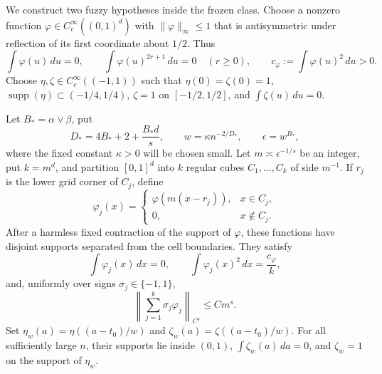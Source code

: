 We construct two fuzzy hypotheses inside the frozen class. Choose a nonzero function \(\varphi\in C_c^\infty((0,1)^d)\) with \(\lVert\varphi\rVert_\infty\le1\) that is antisymmetric under reflection of its first coordinate about \(1/2\). Thus
\[
\int\varphi(u)\,du=0,
\qquad
\int\varphi(u)^{2r+1}\,du=0\quad(r\ge0),
\qquad
c_\varphi:=\int\varphi(u)^2\,du>0.
\]
Choose \(\eta,\zeta\in C_c^\infty((-1,1))\) such that \(\eta(0)=\zeta(0)=1\), \(\operatorname{supp}(\eta)\subset(-1/4,1/4)\), \(\zeta=1\) on \([-1/2,1/2]\), and \(\int\zeta(u)\,du=0\).

Let \(B_*=\alpha\vee\beta\), put
\[
D_*=4B_*+2+\frac{B_*d}{s},
\qquad
w=\kappa n^{-2/D_*},
\qquad
\epsilon=w^{B_*},
\]
where the fixed constant \(\kappa>0\) will be chosen small. Let \(m\asymp\epsilon^{-1/s}\) be an integer, put \(k=m^d\), and partition \([0,1]^d\) into \(k\) regular cubes \(C_1,\ldots,C_k\) of side \(m^{-1}\). If \(r_j\) is the lower grid corner of \(C_j\), define
\[
\varphi_j(x)=
\begin{cases}
\varphi(m(x-r_j)),&x\in C_j,\\
0,&x\notin C_j.
\end{cases}
\]
After a harmless fixed contraction of the support of \(\varphi\), these functions have disjoint supports separated from the cell boundaries. They satisfy
\[
\int\varphi_j(x)\,dx=0,
\qquad
\int\varphi_j(x)^2\,dx=\frac{c_\varphi}{k},
\]
and, uniformly over signs \(\sigma_j\in\{-1,1\}\),
\[
\left\lVert\sum_{j=1}^k\sigma_j\varphi_j\right\rVert_{C^s}
\le C m^s.
\]
Set \(\eta_w(a)=\eta((a-t_0)/w)\) and \(\zeta_w(a)=\zeta((a-t_0)/w)\). For all sufficiently large \(n\), their supports lie inside \((0,1)\), \(\int\zeta_w(a)\,da=0\), and \(\zeta_w=1\) on the support of \(\eta_w\).


